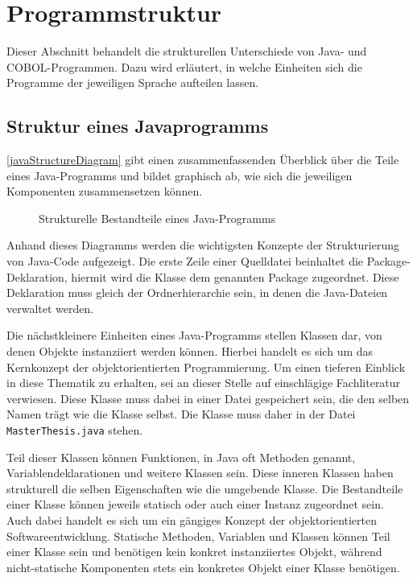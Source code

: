 \section{Programmstruktur}\label{sec:structure}
Dieser Abschnitt behandelt die strukturellen Unterschiede von Java- und COBOL-Programmen. Dazu wird erläutert, in welche Einheiten sich die Programme der jeweiligen Sprache aufteilen lassen. 

\subsection*{Struktur eines Javaprogramms}
\autoref{javaStructureDiagram} gibt einen zusammenfassenden Überblick über die Teile eines Java-Programms und bildet graphisch ab, wie sich die jeweiligen Komponenten zusammensetzen können.

\begin{figure}[H]
    \centering
    \resizebox{.9\linewidth}{!}{\unskip}
    \caption{Strukturelle Bestandteile eines Java-Programms \label{javaStructureDiagram}}
\end{figure}

Anhand dieses Diagramms werden die wichtigsten Konzepte der Strukturierung von Java-Code aufgezeigt. Die erste Zeile einer Quelldatei beinhaltet die Package-Deklaration, \dahe hiermit wird die Klasse dem genannten Package zugeordnet. Diese Deklaration muss gleich der Ordnerhierarchie sein, in denen die Java-Dateien verwaltet werden. 

Die nächstkleinere Einheiten eines Java-Programms stellen Klassen dar, von denen Objekte instanziiert werden können. Hierbei handelt es sich um das Kernkonzept der objektorientierten Programmierung. Um einen tieferen Einblick in diese Thematik zu erhalten, sei an dieser Stelle auf einschlägige Fachliteratur verwiesen. Diese Klasse muss dabei in einer Datei gespeichert sein, die den selben Namen trägt wie die Klasse selbst. Die Klasse  muss daher in der Datei \texttt{MasterThesis.java} stehen.


Teil dieser Klassen können Funktionen, in Java oft Methoden genannt, Variablendeklarationen und weitere Klassen sein. Diese inneren Klassen haben strukturell die selben Eigenschaften wie die umgebende Klasse. Die Bestandteile einer Klasse können jeweils statisch oder auch einer Instanz zugeordnet sein. Auch dabei handelt es sich um ein gängiges Konzept der objektorientierten Softwareentwicklung. Statische Methoden, Variablen und Klassen können Teil einer Klasse sein und benötigen kein konkret instanziiertes Objekt, während nicht-statische Komponenten stets ein konkretes Objekt einer Klasse benötigen. 

